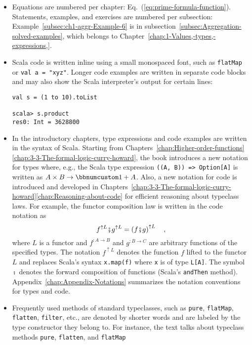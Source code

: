 \begin{itemize}
\item Equations are numbered per chapter: Eq.~(\ref{eq:prime-formula-function}).
Statements, examples, and exercises are numbered per subsection: Example~\ref{subsec:ch1-aggr-Example-6}
is in subsection~\ref{subsec:Aggregation-solved-examples}, which
belongs to Chapter~\ref{chap:1-Values,-types,-expressions,}.
\item Scala code is written inline using a small monospaced font, such as
\lstinline!flatMap! or \lstinline!val a = "xyz"!. Longer code examples
are written in separate code blocks and may also show the Scala interpreter\textsf{'}s
output for certain lines:
\begin{lstlisting}[mathescape=true]
val s = (1 to 10).toList

scala> s.product
res0: Int = 3628800 
\end{lstlisting}
\item In the introductory chapters, type expressions and code examples are
written in the syntax of Scala. Starting from Chapters~\ref{chap:Higher-order-functions}\textendash \ref{chap:3-3-The-formal-logic-curry-howard},
the book introduces a new notation for types where, e.g., the Scala
type expression \lstinline!((A, B)) => Option[A]! is written as $A\times B\rightarrow\bbnum 1+A$.
Also, a new notation for code is introduced and developed in Chapters~\ref{chap:3-3-The-formal-logic-curry-howard}\textendash \ref{chap:Reasoning-about-code}
for efficient reasoning about typeclass laws. For example, the functor
composition law is written in the code notation as
\[
f^{\uparrow L}\bef g^{\uparrow L}=\left(f\bef g\right)^{\uparrow L}\quad,
\]
where $L$ is a functor and $f^{:A\rightarrow B}$ and $g^{:B\rightarrow C}$
are arbitrary functions of the specified types. The notation $f^{\uparrow L}$
denotes the function $f$ lifted to the functor $L$ and replaces
Scala\textsf{'}s syntax \lstinline!x.map(f)! where \lstinline!x! is of type
\lstinline!L[A]!. The symbol $\bef$ denotes the forward composition
of functions (Scala\textsf{'}s \lstinline!andThen! method). Appendix~\ref{chap:Appendix-Notations}
summarizes the notation conventions for types and code.
\item Frequently used methods of standard typeclasses, such as \lstinline!pure!,
\lstinline!flatMap!, \lstinline!flatten!, \lstinline!filter!, etc.,
are denoted by shorter words and are labeled by the type constructor
they belong to. For instance, the text talks about typeclass methods
\lstinline!pure!, \lstinline!flatten!, and \lstinline!flatMap!

\end{itemize}
